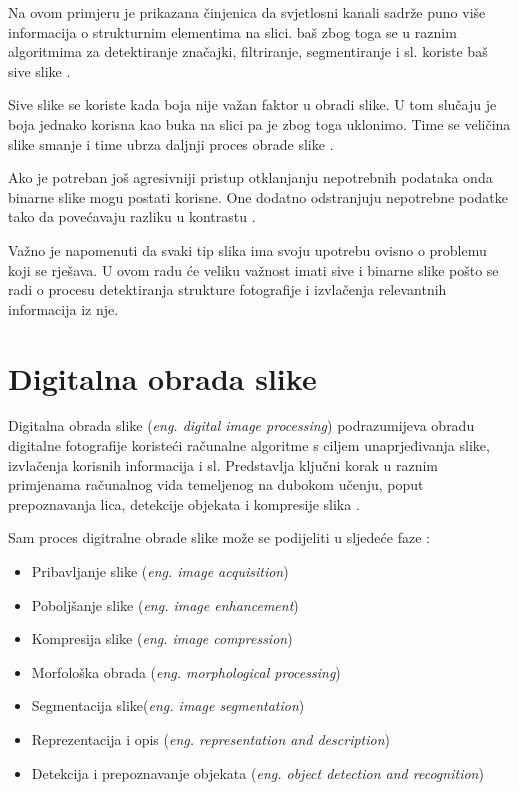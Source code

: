 \documentclass{foi}
\begin{document}
Na ovom primjeru je prikazana činjenica da svjetlosni kanali sadrže puno više informacija o strukturnim elementima na slici. baš zbog toga se u raznim algoritmima za detektiranje značajki, filtriranje, segmentiranje i sl. koriste baš sive slike \cite{LumVsChrom}. 

Sive slike se koriste kada boja nije važan faktor u obradi slike. U tom slučaju je boja jednako korisna kao buka na slici pa je zbog toga uklonimo. Time se veličina slike smanje i time ubrza daljnji proces obrade slike \cite{LumVsChrom}.

Ako je potreban još agresivniji pristup otklanjanju nepotrebnih podataka onda binarne slike mogu postati korisne. One dodatno odstranjuju nepotrebne podatke tako da povećavaju razliku u kontrastu \cite{LumVsChrom}.

Važno je napomenuti da svaki tip slika ima svoju upotrebu ovisno o problemu koji se rješava. U ovom radu će veliku važnost imati sive i binarne slike pošto se radi o procesu detektiranja strukture fotografije i izvlačenja relevantnih informacija iz nje.


\section{Digitalna obrada slike}

Digitalna obrada slike (\textit{eng. digital image processing}) podrazumijeva obradu digitalne fotografije koristeći računalne algoritme s ciljem unaprjeđivanja slike, izvlačenja korisnih informacija i sl. Predstavlja ključni korak u raznim primjenama računalnog vida temeljenog na dubokom učenju, poput prepoznavanja lica, detekcije objekata i kompresije slika \cite{ImageProcessing}. 

\begin{flushleft}
Sam proces digitralne obrade slike može se podijeliti u sljedeće faze \cite{ImageProcessing}:
\begin{itemize}
\item Pribavljanje slike (\textit{eng. image acquisition})
\item Poboljšanje slike (\textit{eng. image enhancement})
\item Kompresija slike (\textit{eng. image compression})
\item Morfološka obrada (\textit{eng. morphological processing})
\item Segmentacija slike(\textit{eng. image segmentation})
\item Reprezentacija i opis (\textit{eng. representation and description})
\item Detekcija i prepoznavanje objekata (\textit{eng. object detection and recognition})
\end{itemize}
\end{flushleft}
\end{document}
